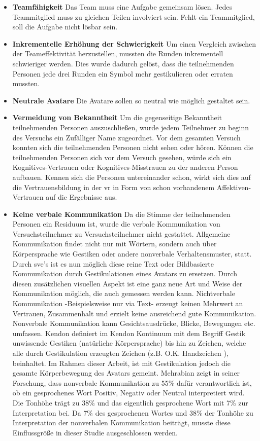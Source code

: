 \documentclass[a4paper,11pt]{article}%
\renewcommand{\\}{\vspace*{0.5\baselineskip} \newline}
\begin{document}
\begin{itemize}
\item \textbf{Teamfähigkeit} Das Team muss eine Aufgabe gemeinsam lösen. Jedes Teammitglied muss zu gleichen Teilen involviert sein. Fehlt ein Teammitglied, soll die Aufgabe nicht lösbar sein.
\item \textbf{Inkrementelle Erhöhung der Schwierigkeit} Um einen Vergleich zwischen der Teameffektivität herzustellen, mussten die Runden inkrementell schwieriger werden. Dies wurde dadurch gelöst, dass die teilnehmenden Personen jede drei Runden ein Symbol mehr gestikulieren  oder erraten mussten.
\item \textbf{Neutrale Avatare} Die Avatare sollen so neutral wie möglich gestaltet sein. 
\item \textbf{Vermeidung von Bekanntheit} Um die gegenseitige Bekanntheit  teilnehmenden Personen auszuschließen, wurde jedem Teilnehmer zu beginn des Versuchs ein Zufälliger Name zugeordnet. Vor dem gesamten Versuch konnten sich die teilnehmenden Personen nicht sehen oder hören.
Können die teilnehmenden Personen sich vor dem Versuch gesehen, würde sich ein Kognitives-Vertrauen oder Kognitives-Misstrauen zu der anderen Person aufbauen. 
Kennen sich die Personen untereinander schon, wirkt sich dies auf die Vertrauensbildung in der \ac{vr} in Form von schon vorhandenem Affektiven-Vertrauen auf die Ergebnisse aus.
\item \textbf{Keine verbale Kommunikation} Da die Stimme der teilnehmenden Personen ein Residuum ist, wurde die verbale Kommunikation von Versuchsteilnehmer zu Versuchsteilnehmer nicht gestattet. Allgemeine Kommunikation findet nicht nur mit Wörtern, sondern auch über Körpersprache wie Gestiken oder andere nonverbale Verhaltensmuster, statt. Durch \ac{sve}'s ist es nun möglich diese reine Text oder Bildbasierte Kommunikation durch Gestikulationen eines Avatars zu ersetzen. Durch diesen zusätzlichen visuellen Aspekt ist eine ganz neue Art und Weise der Kommunikation möglich, die auch gemessen werden kann. 
Nichtverbale Kommunikation -Beispielsweise nur via Text- erzeugt keinen Mehrwert an Vertrauen, Zusammenhalt und erzielt keine ausreichend gute Kommunikation. \citep[p.81]{haslam2003social}			
Nonverbale Kommunikation kann Gesichtsausdrücke, Blicke, Bewegungen etc. umfassen. Kendon definiert im \dq{}Kendon Kontinuum\dq{} mit dem Begriff \dq{}Gestik\dq{} unwissende Gestiken (natürliche Körpersprache) bis hin zu \dq{} Zeichen\flqq, welche alle durch Gestikulation erzeugten Zeichen (z.B. O.K. Handzeichen ), beinhaltet. \citep[37]{mcneill1992hand} 
Im Rahmen dieser Arbeit, ist mit Gestikulation jedoch die gesamte Körperbewegung des Avatars gemeint.
Mehrabian zeigt in seiner Forschung, dass nonverbale Kommunikation zu 55\% dafür verantwortlich ist, ob ein gesprochenes Wort Positiv, Negativ oder Neutral interpretiert wird. Die Tonhöhe trägt zu 38\% und das eigentlich gesprochene Wort mit 7\% zur Interpretation bei. \citep[43]{mehrabian1971silent}
Da 7\% des gesprochenen Wortes und 38\% der Tonhöhe zu Interpretation der nonverbalen Kommunikation beiträgt, musste diese Einflussgröße in dieser Studie ausgeschlossen werden.
\end{itemize}
\end{document}
